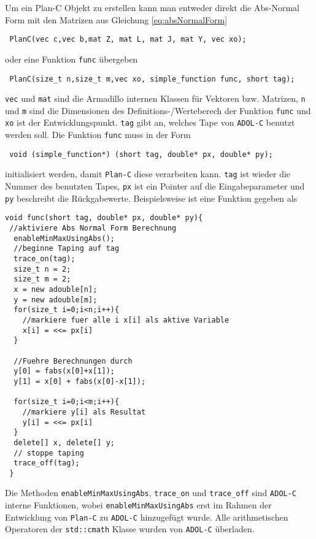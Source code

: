Um ein Plan-C Objekt zu erstellen kann man entweder direkt die Abs-Normal Form mit den Matrizen aus Gleichung  \eqref{eq:absNormalForm} 
\begin{lstlisting}
 PlanC(vec c,vec b,mat Z, mat L, mat J, mat Y, vec xo);
\end{lstlisting}
oder eine Funktion \texttt{func} übergeben
\begin{lstlisting}
 PlanC(size_t n,size_t m,vec xo, simple_function func, short tag);
\end{lstlisting}
\texttt{vec} und \texttt{mat} sind die Armadillo internen Klassen für Vektoren bzw. Matrizen, \texttt{n} und \texttt{m} sind die Dimensionen des Definitions-/Werteberech der Funktion \texttt{func} und \texttt{xo} ist der Entwicklungspunkt. \texttt{tag} gibt an, welches Tape von \texttt{ADOL-C} benutzt werden soll. 
Die Funktion \texttt{func} muss in der Form 
\begin{lstlisting}
 void (simple_function*) (short tag, double* px, double* py);
\end{lstlisting}
initialisiert werden, damit \texttt{Plan-C} diese verarbeiten kann. \texttt{tag} ist wieder die Nummer des benutzten Tapes,  \texttt{px} ist ein Pointer auf die Eingabeparameter und \texttt{py} beschreibt die Rückgabewerte. 
Beispielsweise ist eine Funktion gegeben als
\begin{lstlisting}[caption=Beispiel einer simple\_function,label=lst:simpleFunc]
 void func(short tag, double* px, double* py){
 //aktiviere Abs Normal Form Berechnung
  enableMinMaxUsingAbs();
  //beginne Taping auf tag
  trace_on(tag);
  size_t n = 2;
  size_t m = 2;
  x = new adouble[n];
  y = new adouble[m];
  for(size_t i=0;i<n;i++){
    //markiere fuer alle i x[i] als aktive Variable
    x[i] = <<= px[i]		
  }
  
  //Fuehre Berechnungen durch
  y[0] = fabs(x[0]+x[1]);
  y[1] = x[0] + fabs(x[0]-x[1]);
  
  for(size_t i=0;i<m;i++){
    //markiere y[i] als Resultat
    y[i] = <<= px[i]		
  }
  delete[] x, delete[] y;
  // stoppe taping
  trace_off(tag); 
 }
\end{lstlisting}

Die Methoden \texttt{enableMinMaxUsingAbs}, \texttt{trace\_on} und \texttt{trace\_off} sind \texttt{ADOL-C} interne Funktionen, wobei \texttt{enableMinMaxUsingAbs} erst im Rahmen der Entwicklung von \texttt{Plan-C} zu \texttt{ADOL-C} hinzugefügt wurde. Alle arithmetischen Operatoren der \texttt{std::cmath} Klasse wurden von \texttt{ADOL-C} überladen.

